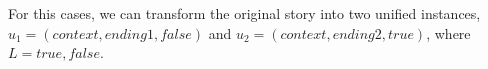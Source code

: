 For this cases, 
we can transform the original story into two unified instances, 
$u_1=(context, ending1, false)$ and $u_2=(context, ending2, true)$, where $L = {true, false}$.

 

